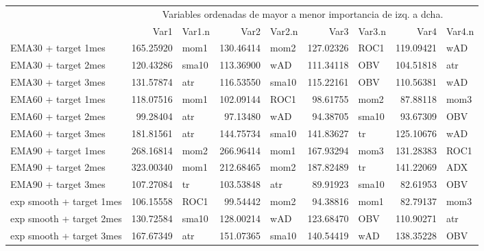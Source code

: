 \documentclass[]{DissertateUSU}
\begin{document}
\begin{table}[H]
\centering\begingroup\fontsize{10}{12}\selectfont

\begin{tabular}{l|r|l|r|l|r|l|r|l}
\hline
\multicolumn{1}{c|}{ } & \multicolumn{8}{c}{Variables ordenadas de mayor a menor importancia de izq. a dcha.} \\
\cline{2-9}
  & Var1 & Var1.n & Var2 & Var2.n & Var3 & Var3.n & Var4 & Var4.n\\
\hline
EMA30 + target 1mes & 165.25920 & mom1 & 130.46414 & mom2 & 127.02326 & ROC1 & 119.09421 & wAD\\
\hline
EMA30 + target 2mes & 120.43286 & sma10 & 113.36900 & wAD & 111.34118 & OBV & 104.51818 & atr\\
\hline
EMA30 + target 3mes & 131.57874 & atr & 116.53550 & sma10 & 115.22161 & OBV & 110.56381 & wAD\\
\hline
EMA60 + target 1mes & 118.07516 & mom1 & 102.09144 & ROC1 & 98.61755 & mom2 & 87.88118 & mom3\\
\hline
EMA60 + target 2mes & 99.28404 & atr & 97.13480 & wAD & 94.38705 & sma10 & 93.67309 & OBV\\
\hline
EMA60 + target 3mes & 181.81561 & atr & 144.75734 & sma10 & 141.83627 & tr & 125.10676 & wAD\\
\hline
EMA90 + target 1mes & 268.16814 & mom2 & 266.96414 & mom1 & 167.93294 & mom3 & 131.28383 & ROC1\\
\hline
EMA90 + target 2mes & 323.00340 & mom1 & 212.68465 & mom2 & 187.82489 & tr & 141.22069 & ADX\\
\hline
EMA90 + target 3mes & 107.27084 & tr & 103.53848 & atr & 89.91923 & sma10 & 82.61953 & OBV\\
\hline
exp smooth + target 1mes & 106.15558 & ROC1 & 99.54442 & mom2 & 94.38816 & mom1 & 82.79137 & mom3\\
\hline
exp smooth + target 2mes & 130.72584 & sma10 & 128.00214 & wAD & 123.68470 & OBV & 110.90271 & atr\\
\hline
exp smooth + target 3mes & 167.67349 & atr & 151.07365 & sma10 & 140.54419 & wAD & 138.35228 & OBV\\
\hline
\end{tabular}
\endgroup{}
\end{table}

\setlength\parskip{5ex}
\end{document}
